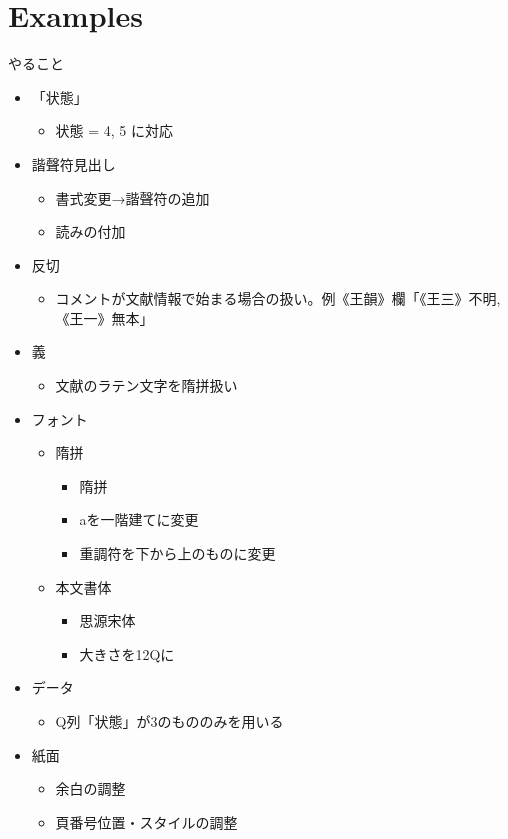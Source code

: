 \documentclass[a5paper]{article}
\begin{document}
\part{Examples}
やること
\begin{itemize}
\item{} 「状態」
  \begin{itemize}
  \item{} 状態 = 4, 5 に対応
  \end{itemize}
\item{} 諧聲符見出し
  \begin{itemize}
  \item{} 書式変更→諧聲符の追加
  \item{} 読みの付加
  \end{itemize}
\item{} 反切
  \begin{itemize}
  \item{} コメントが文献情報で始まる場合の扱い。例《王韻》欄「《王三》不明,《王一》無本」
  \end{itemize}
\item{} 義
  \begin{itemize}
  \item{} 文献のラテン文字を隋拼扱い
  \end{itemize}
\item{} フォント
  \begin{itemize}
  \item{} 隋拼
    \begin{itemize}
    \item{} 隋拼
    \item{} aを一階建てに変更
    \item{} 重調符を下から上のものに変更
    \end{itemize}
  \item{} 本文書体
    \begin{itemize}
    \item{} 思源宋体
    \item{} 大きさを12Qに
    \end{itemize}
  \end{itemize}
\item{} データ
  \begin{itemize}
  \item{} Q列「状態」が3のもののみを用いる
  \end{itemize}
\item{} 紙面
  \begin{itemize}
  \item{} 余白の調整
  \item{} 頁番号位置・スタイルの調整
  \end{itemize}
\end{itemize}
\end{document}
